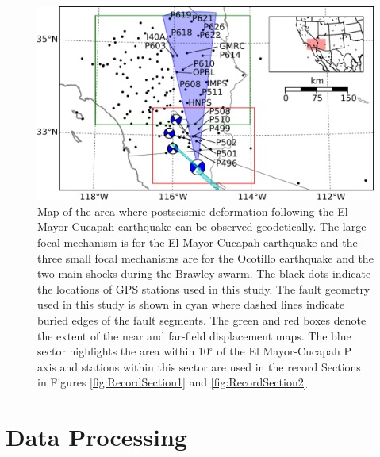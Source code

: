 \documentclass[1p]{elsarticle}
\begin{document}
\begin{figure}
\includegraphics[scale=0.7]{Figures/ContextMap} 
\caption{Map of the area where postseismic deformation following the El Mayor-Cucapah earthquake can be observed geodetically. The large focal mechanism is for the El Mayor Cucapah earthquake and the three small focal mechanisms are for the Ocotillo earthquake and the two main shocks during the Brawley swarm. The black dots indicate the locations of GPS stations used in this study.  The fault geometry used in this study is shown in cyan where dashed lines indicate buried edges of the fault segments.  The green and red boxes denote the extent of the near and far-field displacement maps.  The blue sector highlights the area within 10$^\circ$ of the El Mayor-Cucapah P axis and stations within this sector are used in the record Sections in Figures \ref{fig:RecordSection1} and \ref{fig:RecordSection2}}       
\label{fig:ContextMap}
\end{figure}

\section{Data Processing}\label{sec:Data}
\end{document}
